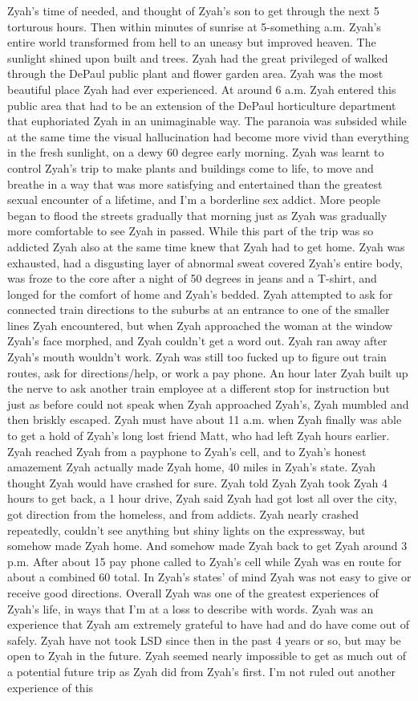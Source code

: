 \documentclass[12pt]{book}
\begin{document}
Zyah's time of needed, and thought of Zyah's son to get through the next 5 torturous hours. Then within minutes of sunrise at 5-something a.m. Zyah's entire world transformed from hell to an uneasy but improved heaven. The sunlight shined upon built and trees. Zyah had the great privileged of walked through the DePaul public plant and flower garden area. Zyah was the most beautiful place Zyah had ever experienced. At around 6 a.m. Zyah entered this public area that had to be an extension of the DePaul horticulture department that euphoriated Zyah in an unimaginable way. The paranoia was subsided while at the same time the visual hallucination had become more vivid than everything in the fresh sunlight, on a dewy 60 degree early morning. Zyah was learnt to control Zyah's trip to make plants and buildings come to life, to move and breathe in a way that was more satisfying and entertained than the greatest sexual encounter of a lifetime, and I'm a borderline sex addict. More people began to flood the streets gradually that morning just as Zyah was gradually more comfortable to see Zyah in passed. While this part of the trip was so addicted Zyah also at the same time knew that Zyah had to get home. Zyah was exhausted, had a disgusting layer of abnormal sweat covered Zyah's entire body, was froze to the core after a night of 50 degrees in jeans and a T-shirt, and longed for the comfort of home and Zyah's bedded. Zyah attempted to ask for connected train directions to the suburbs at an entrance to one of the smaller lines Zyah encountered, but when Zyah approached the woman at the window Zyah's face morphed, and Zyah couldn't get a word out. Zyah ran away after Zyah's mouth wouldn't work. Zyah was still too fucked up to figure out train routes, ask for directions/help, or work a pay phone. An hour later Zyah built up the nerve to ask another train employee at a different stop for instruction but just as before could not speak when Zyah approached Zyah's, Zyah mumbled and then briskly escaped. Zyah must have about 11 a.m. when Zyah finally was able to get a hold of Zyah's long lost friend Matt, who had left Zyah hours earlier. Zyah reached Zyah from a payphone to Zyah's cell, and to Zyah's honest amazement Zyah actually made Zyah home, 40 miles in Zyah's state. Zyah thought Zyah would have crashed for sure. Zyah told Zyah Zyah took Zyah 4 hours to get back, a 1 hour drive, Zyah said Zyah had got lost all over the city, got direction from the homeless, and from addicts. Zyah nearly crashed repeatedly, couldn't see anything but shiny lights on the expressway, but somehow made Zyah home. And somehow made Zyah back to get Zyah around 3 p.m. After about 15 pay phone called to Zyah's cell while Zyah was en route for about a combined 60 total. In Zyah's states' of mind Zyah was not easy to give or receive good directions. Overall Zyah was one of the greatest experiences of Zyah's life, in ways that I'm at a loss to describe with words. Zyah was an experience that Zyah am extremely grateful to have had and do have come out of safely. Zyah have not took LSD since then in the past 4 years or so, but may be open to Zyah in the future. Zyah seemed nearly impossible to get as much out of a potential future trip as Zyah did from Zyah's first. I'm not ruled out another experience of this 
\end{document}
